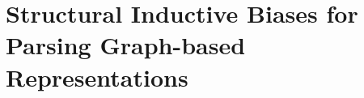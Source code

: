 \chapter[Structural Inductive Biases for Parsing Graph-based \\Representations]{
Structural Inductive Biases for Parsing Graph-based Representations
}
\label{chap:lexical-phrasal}











% 




